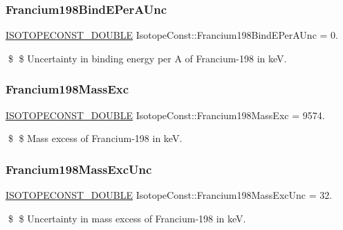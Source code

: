 \subsubsection{\texorpdfstring{Francium198\+Bind\+E\+Per\+A\+Unc}{Francium198BindEPerAUnc}}
{\footnotesize\ttfamily \mbox{\hyperlink{group___isotope_const-_macros_ga8f45a7272ce02c0b4c65c44636ed719a}{I\+S\+O\+T\+O\+P\+E\+C\+O\+N\+S\+T\+\_\+\+D\+O\+U\+B\+LE}} Isotope\+Const\+::\+Francium198\+Bind\+E\+Per\+A\+Unc = 0.}

\$ \$ Uncertainty in binding energy per A of Francium-\/198 in keV. \mbox{\label{group___isotope_const-_francium-_fr198_ga17cb888454bdb395291b216748afac25}} 
\subsubsection{\texorpdfstring{Francium198\+Mass\+Exc}{Francium198MassExc}}
{\footnotesize\ttfamily \mbox{\hyperlink{group___isotope_const-_macros_ga8f45a7272ce02c0b4c65c44636ed719a}{I\+S\+O\+T\+O\+P\+E\+C\+O\+N\+S\+T\+\_\+\+D\+O\+U\+B\+LE}} Isotope\+Const\+::\+Francium198\+Mass\+Exc = 9574.}

\$ \$ Mass excess of Francium-\/198 in keV. \mbox{\label{group___isotope_const-_francium-_fr198_gaac1f68acb5e9ce4016ad9bd6fd346fad}} 
\subsubsection{\texorpdfstring{Francium198\+Mass\+Exc\+Unc}{Francium198MassExcUnc}}
{\footnotesize\ttfamily \mbox{\hyperlink{group___isotope_const-_macros_ga8f45a7272ce02c0b4c65c44636ed719a}{I\+S\+O\+T\+O\+P\+E\+C\+O\+N\+S\+T\+\_\+\+D\+O\+U\+B\+LE}} Isotope\+Const\+::\+Francium198\+Mass\+Exc\+Unc = 32.}

\$ \$ Uncertainty in mass excess of Francium-\/198 in keV. \mbox{\label{group___isotope_const-_francium-_fr198_ga4ed4c53e73a785b355523b78c98170cb}} 
